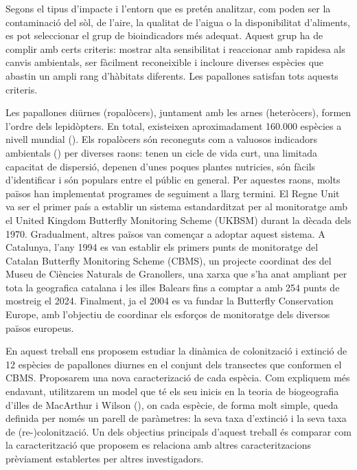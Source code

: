\documentclass{article}
\begin{document}
Segons el tipus d'impacte i l'entorn que es pret\'en analitzar, com poden ser la contaminació del sòl, de l'aire, la qualitat de l'aigua o la disponibilitat d'aliments, es pot seleccionar el grup de bioindicadors més adequat. Aquest grup ha de complir amb certs criteris: mostrar alta sensibilitat i reaccionar amb rapidesa als canvis ambientals, ser fàcilment reconeixible i incloure diverses espècies que abastin un ampli rang d'hàbitats diferents. Les papallones satisfan tots aquests criteris.
\smallskip

Les papallones diürnes (ropalòcers), juntament amb les arnes (heteròcers), formen l'ordre dels lepidòpters. En total, existeixen aproximadament 160.000 espècies a nivell mundial (\cite{lepidopters2023}). Els ropalòcers són reconeguts com a valuosos indicadors ambientals (\cite{thomas2005}) per diverses raons: tenen un cicle de vida curt, una limitada capacitat de dispersió, depenen d'unes poques plantes nutricies, són fàcils d'identificar i són populars entre el públic en general. Per aquestes raons, molts països han implementat programes de seguiment a llarg termini. El Regne Unit va ser el primer país a establir un sistema estandarditzat per al monitoratge amb el United Kingdom Butterfly Monitoring Scheme (UKBSM) durant la dècada dels 1970. Gradualment, altres països van començar a adoptar aquest sistema. A Catalunya, l'any 1994 es van establir els primers punts de monitoratge del Catalan Butterfly Monitoring Scheme (CBMS), un projecte coordinat des del Museu de Ci\`encies Naturals de Granollers, una xarxa que s'ha anat ampliant per tota la geografica catalana i les illes Balears fins a comptar a amb 254 punts de mostreig el 2024. Finalment, ja el 2004 es va fundar la Butterfly Conservation Europe, amb l'objectiu de coordinar els esforços de monitoratge dels diversos pa\"isos europeus.
\smallskip

En aquest treball ens proposem estudiar la din\`amica de colonitzaci\'o i extinci\'o de 12 esp\`ecies de papallones diurnes en el conjunt dels transectes que conformen el CBMS. Proposarem una nova caracterizaci\'o de cada esp\`ecia. Com expliquem m\'es endavant, utilitzarem un model que t\'e els seu inicis en la teoria de biogeografia d'illes de MacArthur i Wilson (\citeyear{MacArthurWilson67}), on cada esp\`ecie, de forma molt simple, queda definida per nom\'es un parell de par\`ametres: la seva taxa d'extinci\'o i la seva taxa de (re-)colonitzaci\'o. Un dels objectius principals d'aquest treball és comparar com la caracterització que proposem es relaciona amb altres caracteritzacions prèviament establertes per altres investigadors. 
\smallskip
\end{document}

